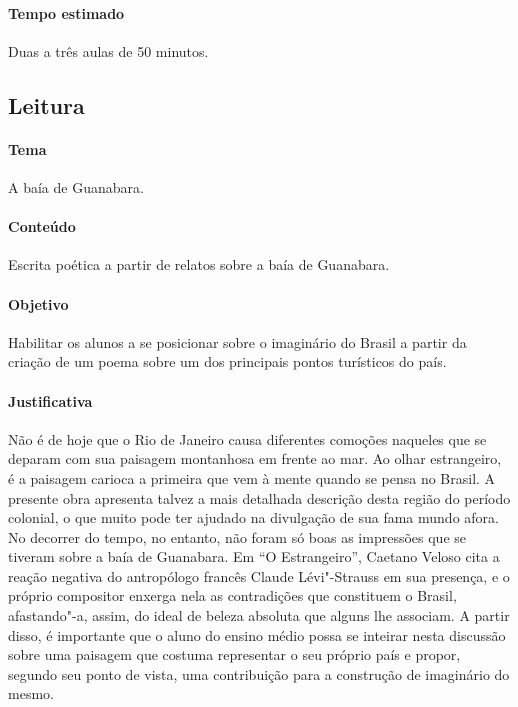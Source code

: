 \documentclass[12pt]{extarticle}
\begin{document}
\paragraph{Tempo estimado} Duas a três aulas de 50 minutos.


\subsection{Leitura}

\paragraph{Tema} A baía de Guanabara.

\paragraph{Conteúdo} Escrita poética a partir de relatos sobre a 
baía de Guanabara.

\paragraph{Objetivo} Habilitar os alunos a se posicionar sobre o imaginário
do Brasil a partir da criação de um poema sobre um dos principais pontos
turísticos do país.

\paragraph{Justificativa} Não é de hoje que o Rio de Janeiro causa 
diferentes comoções naqueles que se deparam com sua paisagem montanhosa
em frente ao mar. Ao olhar estrangeiro, é a paisagem carioca a primeira
que vem à mente quando se pensa no Brasil. 
A presente obra apresenta talvez a mais detalhada descrição desta região
do período colonial, o que muito pode ter ajudado na divulgação de sua 
fama mundo afora. 
No decorrer do tempo, no entanto, não foram só boas as impressões que se 
tiveram sobre a baía de Guanabara. Em ``O Estrangeiro'', Caetano Veloso
cita a reação negativa do antropólogo francês Claude Lévi"-Strauss em sua 
presença, e o próprio compositor enxerga nela as contradições que 
constituem o Brasil, afastando"-a, assim, do ideal de beleza absoluta 
que alguns lhe associam. 
A partir disso, é importante que o aluno do ensino médio possa se inteirar
nesta discussão sobre uma paisagem que costuma representar o seu próprio
país e propor, segundo seu ponto de vista, uma contribuição para a 
construção de imaginário do mesmo. 
\end{document}

